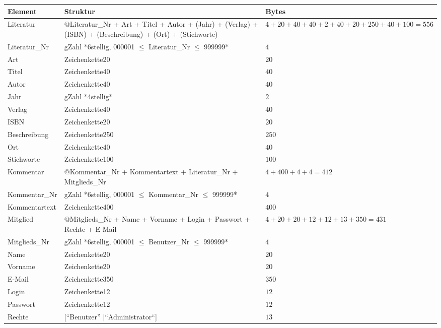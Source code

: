 \begin{longtable}{|l|p{6.0cm}|p{2cm}|}
\hline
Element & Struktur & Bytes\\
\hline\hline
\endhead

Literatur & @Literatur\_Nr + Art + Titel + Autor + (Jahr) + (Verlag) + (ISBN) + (Beschreibung) + (Ort) + (Stichworte) & $4 + 20 + 40 + 40 + 2 + 40 + 20 + 250 + 40 + 100 = 556$ \\
\hline
Literatur\_Nr & gZahl *6stellig, 000001 $\leq$ Literatur\_Nr $\leq$ 999999*  & $4$\\
\hline
Art & Zeichenkette20  & $20$\\
\hline
Titel & Zeichenkette40 & $40$ \\
\hline
Autor & Zeichenkette40 & $40$\\
\hline
Jahr & gZahl *4stellig* & $2$\\
\hline
Verlag & Zeichenkette40 & $40$ \\
\hline
ISBN & Zeichenkette20 & $20$  \\
\hline
Beschreibung & Zeichenkette250 & $250$ \\
\hline
Ort & Zeichenkette40 & $40$ \\
\hline
Stichworte & Zeichenkette100 & $100$\\
\hline\hline

Kommentar & @Kommentar\_Nr + Kommentartext + Literatur\_Nr + Mitglieds\_Nr & $4 + 400 + 4 + 4 = 412 $\\
\hline
Kommentar\_Nr & gZahl *6stellig, 000001 $\leq$ Kommentar\_Nr $\leq$ 999999* & $4$ \\
\hline
Kommentartext & Zeichenkette400 & $400$\\
\hline

Mitglied  & @Mitglieds\_Nr  + Name + Vorname + Login + Passwort + Rechte + E-Mail & $4 + 20 + 20  + 12 + 12 + 13 + 350 = 431 $\\
\hline
Mitglieds\_Nr & gZahl *6stellig, 000001 $\leq$ Benutzer\_Nr $\leq$ 999999* & $4$ \\ 
\hline
Name & Zeichenkette20 & $20$\\
\hline
Vorname & Zeichenkette20 & $20$ \\
\hline
E-Mail & Zeichenkette350 & $350$ \\
\hline
Login & Zeichenkette12 & $12$\\
\hline
Passwort & Zeichenkette12 & $12$\\
\hline
Rechte & [``Benutzer'' $\mid $``Administrator``] & $13$ \\
\hline\hline


\end{longtable}
